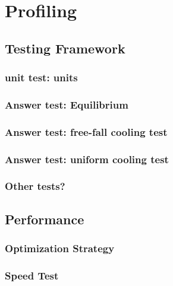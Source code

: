 \section{Profiling} \label{sec:profiling}



\subsection{Testing Framework}


\subsubsection{unit test: units}

\subsubsection{Answer test: Equilibrium}

\subsubsection{Answer test: free-fall cooling test}

\subsubsection{Answer test: uniform cooling test}

\subsubsection{Other tests?}


\subsection{Performance}


\subsubsection{Optimization Strategy}


\subsubsection{Speed Test}
